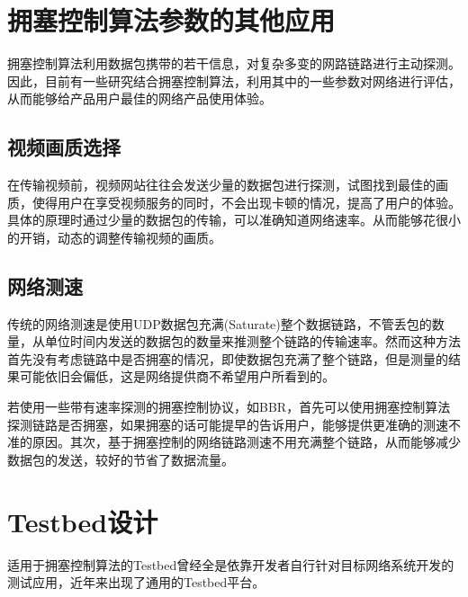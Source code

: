 \documentclass[a4paper, 12pt, UTF8]{ctexart}
\begin{document}
\section{拥塞控制算法参数的其他应用}
\par 拥塞控制算法利用数据包携带的若干信息，对复杂多变的网路链路进行主动探测。因此，目前有一些研究结合拥塞控制算法，利用其中的一些参数对网络进行评估，从而能够给产品用户最佳的网络产品使用体验。

\subsection{视频画质选择}
\par 在传输视频前，视频网站往往会发送少量的数据包进行探测，试图找到最佳的画质\cite{DBLP:conf/nsdi/YanAZFHZLW20}，使得用户在享受视频服务的同时，不会出现卡顿的情况，提高了用户的体验。具体的原理时通过少量的数据包的传输，可以准确知道网络速率。从而能够花很小的开销，动态的调整传输视频的画质。

\subsection{网络测速}
\par 传统的网络测速是使用UDP数据包充满(Saturate)整个数据链路，不管丢包的数量，从单位时间内发送的数据包的数量来推测整个链路的传输速率。然而这种方法首先没有考虑链路中是否拥塞的情况，即使数据包充满了整个链路，但是测量的结果可能依旧会偏低，这是网络提供商不希望用户所看到的。
\par 若使用一些带有速率探测的拥塞控制协议，如BBR，首先可以使用拥塞控制算法探测链路是否拥塞，如果拥塞的话可能提早的告诉用户，能够提供更准确的测速不准的原因\cite{DBLP:conf/imc/SundaresanDFLD17}。其次，基于拥塞控制的网络链路测速不用充满整个链路，从而能够减少数据包的发送，较好的节省了数据流量。


\clearpage 

\section{Testbed设计}
\par 适用于拥塞控制算法的Testbed曾经全是依靠开发者自行针对目标网络系统开发的测试应用，近年来出现了通用的Testbed平台。
\end{document}
